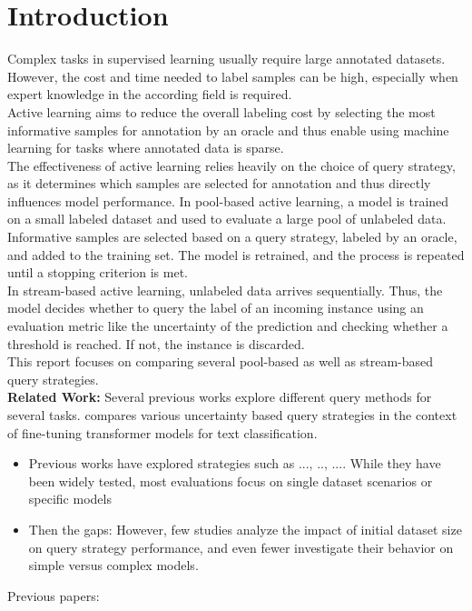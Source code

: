 \documentclass{article}
\theoremstyle{plain}
\theoremstyle{definition}
\theoremstyle{remark}
\begin{document}
\section{Introduction}\label{sec:intro}
Complex tasks in supervised learning usually require large annotated datasets. However, the cost and time needed to label samples can be high, especially when expert knowledge in the according field is required.  \\
Active learning aims to reduce the overall labeling cost by selecting the most informative samples for annotation by an oracle and thus enable using machine learning for tasks where annotated data is sparse. \\
The effectiveness of active learning relies heavily on the choice of query strategy, as it determines which samples are selected for annotation and thus directly influences model performance. In pool-based active learning, a model is trained on a small labeled dataset and used to evaluate a large pool of unlabeled data. Informative samples are selected based on a query strategy, labeled by an oracle, and added to the training set. The model is retrained, and the process is repeated until a stopping criterion is met. \\ 
In stream-based active learning, unlabeled data arrives sequentially. Thus, the model decides whether to query the label of an incoming instance using an evaluation metric like the uncertainty of the prediction and checking whether a threshold is reached. If not, the instance is discarded. \\
This report focuses on comparing several pool-based as well as stream-based query strategies. \\
\textbf{Related Work:} Several previous works explore different query methods for several tasks. \cite{revisitinguncertaintybasedquerystrategies} compares various uncertainty based query strategies in the context of fine-tuning transformer models for text classification. 
\begin{itemize}
	\item Previous works have explored strategies such as ..., .., .... While they have been widely tested, most evaluations focus on  single dataset scenarios or specific models
	\item Then the gaps: However, few studies analyze the impact of initial dataset size on query strategy performance, and even fewer investigate their behavior on simple versus complex models.
\end{itemize}
Previous papers:
\end{document}
